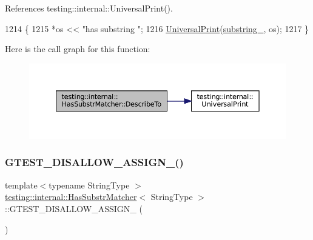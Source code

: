 References testing\+::internal\+::\+Universal\+Print().


\begin{DoxyCode}
1214                                         \{
1215     *os << \textcolor{stringliteral}{"has substring "};
1216     \hyperlink{namespacetesting_1_1internal_a30708fa2bacf11895b03bdb21eb72309}{UniversalPrint}(\hyperlink{classtesting_1_1internal_1_1HasSubstrMatcher_ac15185527d4f52eda4574c8b845a52f3}{substring\_}, os);
1217   \}
\end{DoxyCode}
Here is the call graph for this function\+:
\nopagebreak
\begin{figure}[H]
\begin{center}
\leavevmode
\includegraphics[width=350pt]{classtesting_1_1internal_1_1HasSubstrMatcher_a278f177d2cbdfed29f6755ee0739a521_cgraph}
\end{center}
\end{figure}
\mbox{\label{classtesting_1_1internal_1_1HasSubstrMatcher_a05fa9d568e67101a865c9e92cf28b385}} 
\subsubsection{\texorpdfstring{G\+T\+E\+S\+T\+\_\+\+D\+I\+S\+A\+L\+L\+O\+W\+\_\+\+A\+S\+S\+I\+G\+N\+\_\+()}{GTEST\_DISALLOW\_ASSIGN\_()}}
{\footnotesize\ttfamily template$<$typename String\+Type $>$ \\
\hyperlink{classtesting_1_1internal_1_1HasSubstrMatcher}{testing\+::internal\+::\+Has\+Substr\+Matcher}$<$ String\+Type $>$\+::G\+T\+E\+S\+T\+\_\+\+D\+I\+S\+A\+L\+L\+O\+W\+\_\+\+A\+S\+S\+I\+G\+N\+\_\+ (\begin{DoxyParamCaption}\item[{\hyperlink{classtesting_1_1internal_1_1HasSubstrMatcher}{Has\+Substr\+Matcher}$<$ String\+Type $>$}]{ }\end{DoxyParamCaption})\hspace{0.3cm}{\ttfamily [private]}}

